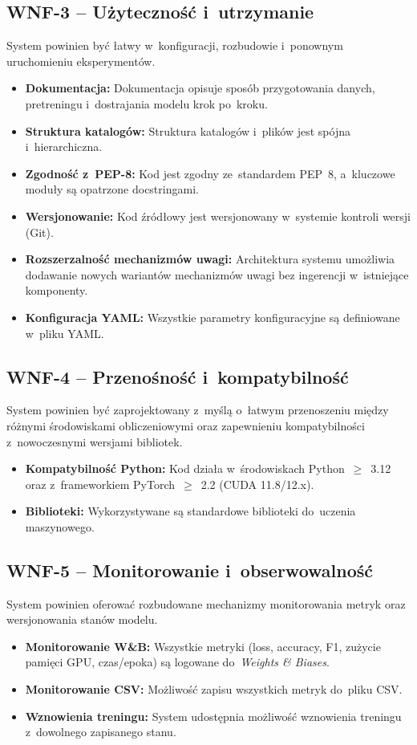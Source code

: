 \documentclass[a4paper,11pt,twoside]{report}
\theoremstyle{definition}
\begin{document}
\subsection{WNF-3 -- Użyteczność i~utrzymanie}
System powinien być łatwy w~konfiguracji, rozbudowie i~ponownym uruchomieniu eksperymentów.
\begin{itemize}
  \item \textbf{Dokumentacja:} Dokumentacja opisuje sposób przygotowania danych, pretreningu i~dostrajania modelu krok po~kroku.
  \item \textbf{Struktura katalogów:} Struktura katalogów i~plików jest spójna i~hierarchiczna.
  \item \textbf{Zgodność z~PEP-8:} Kod jest zgodny ze~standardem PEP~8, a~kluczowe moduły są opatrzone docstringami.
  \item \textbf{Wersjonowanie:} Kod źródłowy jest wersjonowany w~systemie kontroli wersji (Git).
  \item \textbf{Rozszerzalność mechanizmów uwagi:} Architektura systemu umożliwia dodawanie nowych wariantów mechanizmów uwagi bez ingerencji w~istniejące komponenty.
  \item \textbf{Konfiguracja YAML:} Wszystkie parametry konfiguracyjne są definiowane w~pliku YAML.
\end{itemize}


\subsection{WNF-4 -- Przenośność i~kompatybilność}
System powinien być zaprojektowany z~myślą o~łatwym przenoszeniu między różnymi środowiskami obliczeniowymi oraz zapewnieniu kompatybilności z~nowoczesnymi wersjami bibliotek.
\begin{itemize}
  \item \textbf{Kompatybilność Python:} Kod działa w~środowiskach Python~$\geq$~3.12 oraz z~frameworkiem PyTorch~$\geq$~2.2 (CUDA 11.8/12.x).
  \item \textbf{Biblioteki:} Wykorzystywane są standardowe biblioteki do~uczenia maszynowego.
\end{itemize}

\subsection{WNF-5 -- Monitorowanie i~obserwowalność}
System powinien oferować rozbudowane mechanizmy monitorowania metryk oraz wersjonowania stanów modelu.
\begin{itemize}
  \item \textbf{Monitorowanie W\&B:} Wszystkie metryki (loss, accuracy, F1, zużycie pamięci GPU, czas/epoka) są logowane do~\textit{Weights \& Biases}.
  \item \textbf{Monitorowanie CSV:} Możliwość zapisu wszystkich metryk do~pliku CSV.
  \item \textbf{Wznowienia treningu:} System udostępnia możliwość wznowienia treningu z~dowolnego zapisanego stanu.
\end{itemize}
\end{document}
